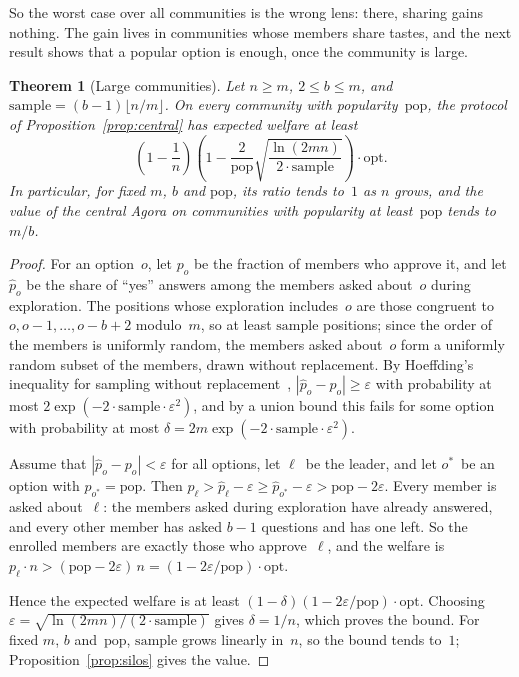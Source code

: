 \documentclass[11pt]{article}
\newtheorem{theorem}{Theorem}
\theoremstyle{definition}
\newcommand{\opt}{\mathrm{opt}}
\newcommand{\pop}{\mathrm{pop}}
\newcommand{\sample}{\mathrm{sample}}
\begin{document}
So the worst case over all communities is the wrong lens: there, sharing gains nothing.
The gain lives in communities whose members share tastes, and the next result shows that a popular option is enough, once the community is large.

\begin{theorem}[Large communities]\label{thm:large}
Let $n \ge m$, $2 \le b \le m$, and $\sample = (b-1)\lfloor n/m \rfloor$.
On every community with popularity~$\pop$, the protocol of Proposition~\ref{prop:central} has expected welfare at least
\[
\left(1 - \frac{1}{n}\right)\left(1 - \frac{2}{\pop}\sqrt{\frac{\ln(2mn)}{2\cdot\sample}}\right)\cdot \opt .
\]
In particular, for fixed $m$, $b$ and $\pop$, its ratio tends to~$1$ as $n$ grows, and the value of the central Agora on communities with popularity at least~$\pop$ tends to $m/b$.
\end{theorem}

\begin{proof}
For an option~$o$, let $p_o$ be the fraction of members who approve it, and let $\hat p_o$ be the share of ``yes'' answers among the members asked about~$o$ during exploration.
The positions whose exploration includes~$o$ are those congruent to $o, o-1, \dots, o-b+2$ modulo~$m$, so at least $\sample$ positions; since the order of the members is uniformly random, the members asked about~$o$ form a uniformly random subset of the members, drawn without replacement.
By Hoeffding's inequality for sampling without replacement~\cite{bardenet2015concentration}, $|\hat p_o - p_o| \ge \varepsilon$ with probability at most $2\exp(-2\cdot\sample\cdot\varepsilon^2)$, and by a union bound this fails for some option with probability at most $\delta = 2m\exp(-2\cdot\sample\cdot\varepsilon^2)$.

Assume that $|\hat p_o - p_o| < \varepsilon$ for all options, let $\ell$~be the leader, and let $o^\ast$~be an option with $p_{o^\ast} = \pop$.
Then $p_\ell > \hat p_\ell - \varepsilon \ge \hat p_{o^\ast} - \varepsilon > \pop - 2\varepsilon$.
Every member is asked about~$\ell$: the members asked during exploration have already answered, and every other member has asked $b-1$ questions and has one left.
So the enrolled members are exactly those who approve~$\ell$, and the welfare is $p_\ell \cdot n > (\pop - 2\varepsilon)\, n = (1 - 2\varepsilon/\pop)\cdot\opt$.

Hence the expected welfare is at least $(1-\delta)(1 - 2\varepsilon/\pop)\cdot\opt$.
Choosing $\varepsilon = \sqrt{\ln(2mn)/(2\cdot\sample)}$ gives $\delta = 1/n$, which proves the bound.
For fixed $m$, $b$ and~$\pop$, $\sample$ grows linearly in~$n$, so the bound tends to~$1$; Proposition~\ref{prop:silos} gives the value.
\end{proof}
\end{document}
